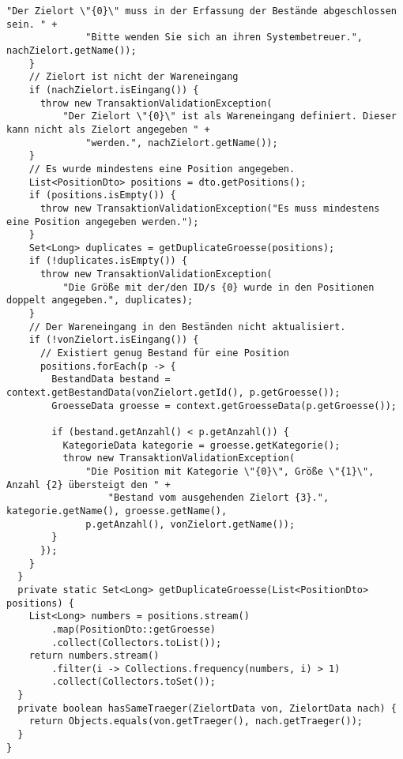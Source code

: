 \begin{lstlisting}[caption={Validierung der übergebenen Daten einer Transaktion.}, label={lst:TransaktionValidaton}]
          "Der Zielort \"{0}\" muss in der Erfassung der Bestände abgeschlossen sein. " +
              "Bitte wenden Sie sich an ihren Systembetreuer.", nachZielort.getName());
    }
    // Zielort ist nicht der Wareneingang
    if (nachZielort.isEingang()) {
      throw new TransaktionValidationException(
          "Der Zielort \"{0}\" ist als Wareneingang definiert. Dieser kann nicht als Zielort angegeben " +
              "werden.", nachZielort.getName());
    }
    // Es wurde mindestens eine Position angegeben.
    List<PositionDto> positions = dto.getPositions();
    if (positions.isEmpty()) {
      throw new TransaktionValidationException("Es muss mindestens eine Position angegeben werden.");
    }
    Set<Long> duplicates = getDuplicateGroesse(positions);
    if (!duplicates.isEmpty()) {
      throw new TransaktionValidationException(
          "Die Größe mit der/den ID/s {0} wurde in den Positionen doppelt angegeben.", duplicates);
    }
    // Der Wareneingang in den Beständen nicht aktualisiert.
    if (!vonZielort.isEingang()) {
      // Existiert genug Bestand für eine Position
      positions.forEach(p -> {
        BestandData bestand = context.getBestandData(vonZielort.getId(), p.getGroesse());
        GroesseData groesse = context.getGroesseData(p.getGroesse());

        if (bestand.getAnzahl() < p.getAnzahl()) {
          KategorieData kategorie = groesse.getKategorie();
          throw new TransaktionValidationException(
              "Die Position mit Kategorie \"{0}\", Größe \"{1}\", Anzahl {2} übersteigt den " +
                  "Bestand vom ausgehenden Zielort {3}.", kategorie.getName(), groesse.getName(),
              p.getAnzahl(), vonZielort.getName());
        }
      });
    }
  }
  private static Set<Long> getDuplicateGroesse(List<PositionDto> positions) {
    List<Long> numbers = positions.stream()
        .map(PositionDto::getGroesse)
        .collect(Collectors.toList());
    return numbers.stream()
        .filter(i -> Collections.frequency(numbers, i) > 1)
        .collect(Collectors.toSet());
  }
  private boolean hasSameTraeger(ZielortData von, ZielortData nach) {
    return Objects.equals(von.getTraeger(), nach.getTraeger());
  }
}
\end{lstlisting}

